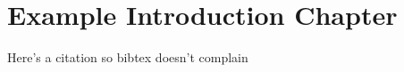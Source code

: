 \chapter{Example Introduction Chapter}

Here's a citation so bibtex doesn't complain~\cite{usher_interactive_2020}

